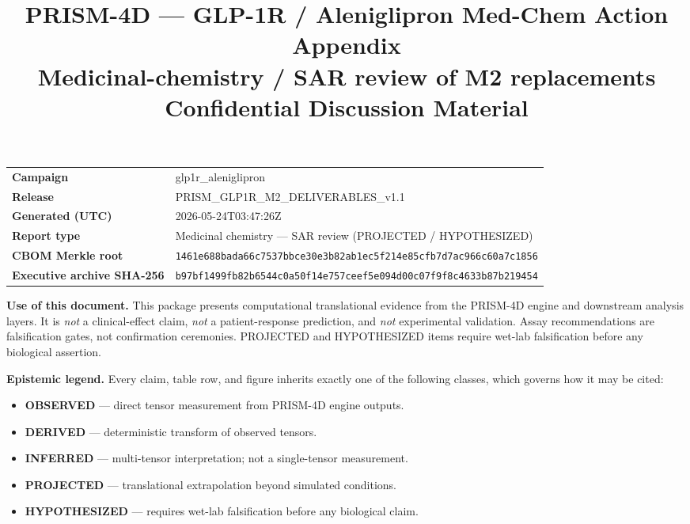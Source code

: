 \documentclass[11pt,a4paper]{article}
\title{
  \vspace{-12mm}
  {\color{DelfBlue}\textbf{\Large PRISM-4D — GLP-1R / Aleniglipron Med-Chem Action Appendix}}\\[2pt]
  {\color{DelfGrey}\normalsize Medicinal-chemistry / SAR review of M2 replacements}\\[6pt]
  {\color{DelfGrey}\small Confidential Discussion Material}
}
\author{}
\date{}
\newcommand{\epOBS}{\textcolor{EpObserved}{\textbf{OBSERVED}}}
\newcommand{\epDER}{\textcolor{EpDerived}{\textbf{DERIVED}}}
\newcommand{\epINF}{\textcolor{EpInferred}{\textbf{INFERRED}}}
\newcommand{\epPRJ}{\textcolor{EpProjected}{\textbf{PROJECTED}}}
\newcommand{\epHYP}{\textcolor{EpHypothesized}{\textbf{HYPOTHESIZED}}}
\begin{document}
\maketitle
\vspace{-14mm}

\begin{flushleft}
\small
\begin{tabular}{@{}p{}p{}@{}}
\textbf{Campaign}             & glp1r\_aleniglipron \\
\textbf{Release}              & PRISM\_GLP1R\_M2\_DELIVERABLES\_v1.1 \\
\textbf{Generated (UTC)}      & 2026-05-24T03:47:26Z \\
\textbf{Report type}          & Medicinal chemistry — SAR review (PROJECTED / HYPOTHESIZED) \\
\textbf{CBOM Merkle root}     & \texttt{\small 1461e688bada66c7537bbce30e3b82ab1ec5f214e85cfb7d7ac966c60a7c1856} \\
\textbf{Executive archive SHA-256} & \texttt{\small b97bf1499fb82b6544c0a50f14e757ceef5e094d00c07f9f8c4633b87b219454} \\
\end{tabular}
\end{flushleft}

\vspace{4mm}

\begin{disclaimerbox}
\textbf{Use of this document.} This package presents computational
translational evidence from the PRISM-4D engine and downstream analysis
layers. It is \emph{not} a clinical-effect claim, \emph{not} a
patient-response prediction, and \emph{not} experimental validation.
Assay recommendations are falsification gates, not confirmation
ceremonies. PROJECTED and HYPOTHESIZED items require wet-lab
falsification before any biological assertion.
\end{disclaimerbox}

\begin{legendbox}
\textbf{Epistemic legend.} Every claim, table row, and figure inherits
exactly one of the following classes, which governs how it may be cited:
\begin{itemize}[leftmargin=18pt,topsep=2pt,itemsep=1pt]
  \item \epOBS{} — direct tensor measurement from PRISM-4D engine outputs.
  \item \epDER{} — deterministic transform of observed tensors.
  \item \epINF{} — multi-tensor interpretation; not a single-tensor measurement.
  \item \epPRJ{} — translational extrapolation beyond simulated conditions.
  \item \epHYP{} — requires wet-lab falsification before any biological claim.
\end{itemize}
\end{legendbox}
\end{document}

